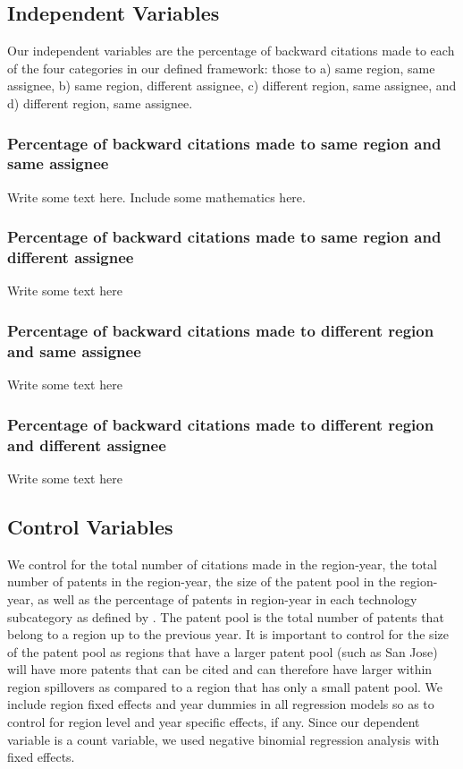 \documentclass[12pt,letterpaper]{article}
\begin{document}
\subsection{Independent Variables}
Our independent variables are the percentage of backward citations made to each of the four categories in our defined framework: those to a) same region, same assignee, b) same region, different assignee, c) different region, same assignee, and d) different region, same assignee. \par
\subsubsection{Percentage of backward citations made to same region and same assignee}
Write some text here. Include some mathematics here.
\subsubsection{Percentage of backward citations made to same region and different assignee}
Write some text here
\subsubsection{Percentage of backward citations made to different region and same assignee}
Write some text here
\subsubsection{Percentage of backward citations made to different region and different assignee}
Write some text here

\subsection{Control Variables}
We control for the total number of citations made in the region-year, the total number of patents in the region-year, the size of the patent pool in the region-year, as well as the percentage of patents in region-year in each technology subcategory as defined by \cite*{Hall2001a}. The patent pool is the total number of patents that belong to a region up to the previous year. It is important to control for the size of the patent pool as  regions that have a larger patent pool (such as San Jose) will have more patents that can be cited and can therefore have larger within region spillovers as compared to a region that has only a small patent pool. We include region fixed effects and year dummies in all regression models so as to control for region level and year specific effects, if any. Since our dependent variable is a count variable, we used negative binomial regression analysis with fixed effects. \par
\end{document}
